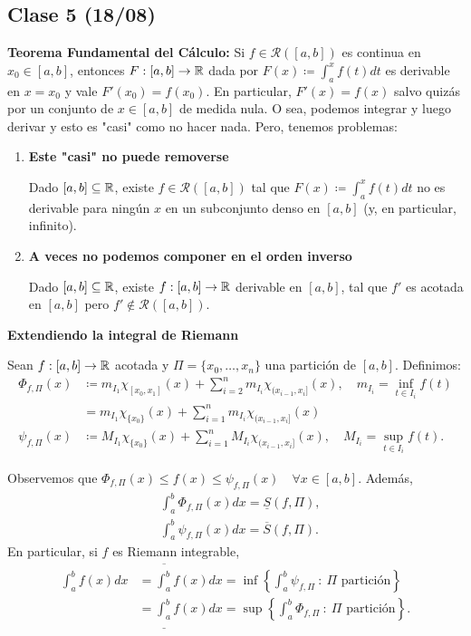 
	\subsection{Clase 5 (18/08)}

	\noindent \textbf{Teorema Fundamental del Cálculo: } Si $f \in \mathcal{R}([a,b])$ es continua en $x_0 \in [a,b]$, entonces $F: [a,b] \to \mathbb{R}$ dada por $F(x) \coloneq \int_{a}^{x} f(t) dt$ es derivable en $x=x_0$ y vale $F'(x_0) = f(x_0)$. En particular, $F'(x) = f(x)$ salvo quizás por un conjunto de $x \in [a,b]$ de medida nula. O sea, podemos integrar y luego derivar y esto es "casi" como no hacer nada. Pero, tenemos problemas:

	\begin{enumerate}
		\item \textbf{Este "casi" no puede removerse}
		\begin{theorem}[Hankel, 1871]
			Dado $[a,b] \subseteq \mathbb{R}$, existe $f\in\mathcal{R}([a,b])$ tal que $F(x) \coloneq \int_{a}^{x} f(t) dt$ no es derivable para ningún $x$ en un subconjunto denso en $[a,b]$ (y, en particular, infinito).
		\end{theorem}

		\item \textbf{A veces no podemos componer en el orden inverso}
		\begin{theorem}[Volterra, 1881]
			Dado $[a,b]\subseteq\mathbb{R}$, existe $f: [a,b]\to\mathbb{R}$ derivable en $[a,b]$, tal que $f'$ es acotada en $[a,b]$ pero $f' \not\in \mathcal{R} ([a,b])$.
		\end{theorem}
	\end{enumerate}

	\noindent \textbf{Extendiendo la integral de Riemann}

	Sean $f:[a,b]\to\mathbb{R}$ acotada y $\Pi = \{ x_0,\dots,x_n \}$ una partición de $[a,b]$. Definimos:
	\begin{align*}
		\Phi_{f,\Pi}(x) & \coloneq m_{I_1} \chi_{[x_0,x_1]} (x) + \sum_{i=2}^{n} m_{I_i} \chi_{(x_{i-1},x_i]}(x), \quad m_{I_i} = \inf_{t \in I_i} f(t) \\
		& = m_{I_1} \chi_{\{x_0\}}(x) + \sum_{i=1}^{n} m_{I_i} \chi_{(x_{i-1},x_i]}(x) \\
		\psi_{f,\Pi}(x) & \coloneq M_{I_1} \chi_{\{x_0\}}(x) + \sum_{i=1}^{n} M_{I_i} \chi_{(x_{i-1},x_i]}(x), \quad M_{I_i} = \sup_{t\in I_i} f(t)
	.\end{align*}

	Observemos que $\Phi_{f,\Pi}(x) \leq f(x) \leq \psi_{f,\Pi}(x) \quad \forall x \in [a,b]$. Además, 
	\begin{align*}
		&\int_{a}^{b} \Phi_{f,\Pi}(x) dx = \underline{S}(f,\Pi), \\
		&\int_{a}^{b} \psi_{f,\Pi}(x) dx = \overline{S}(f,\Pi).
	\end{align*}
	\noindent En particular, si $f$ es Riemann integrable,
	\begin{align*}
		\int_{a}^{b} f(x) dx & = \overline{\int_{a}^{b}} f(x) dx = \inf \left\{ \int_{a}^{b} \psi_{f,\Pi} \ : \ \Pi \text{ partición} \right\} \\
		& = \underline{ \int_{a}^{b} } f(x) dx = \sup \left\{ \int_{a}^{b} \Phi_{f,\Pi} \ : \ \Pi \text{ partición} \right\}
	.\end{align*}

